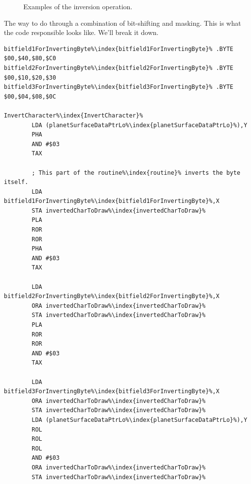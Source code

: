\begin{figure}[H]
{\begin{adjustbox}{width=10cm,center}
    \end{adjustbox}
  }\caption{Examples of the inversion operation.}
\end{figure}

The way to do through a combination of bit-shifting and masking. This is what the code
responsible looks like. We'll break it down.

\begin{lstlisting}[caption=\icode{InvertSurfaceDataForLowerPlanet\index{InvertSurfaceDataForLowerPlanet}}.,escapechar=\%]
bitfield1ForInvertingByte%\index{bitfield1ForInvertingByte}% .BYTE $00,$40,$80,$C0
bitfield2ForInvertingByte%\index{bitfield2ForInvertingByte}% .BYTE $00,$10,$20,$30
bitfield3ForInvertingByte%\index{bitfield3ForInvertingByte}% .BYTE $00,$04,$08,$0C

InvertCharacter%\index{InvertCharacter}%
        LDA (planetSurfaceDataPtrLo%\index{planetSurfaceDataPtrLo}%),Y
        PHA
        AND #$03
        TAX

        ; This part of the routine%\index{routine}% inverts the byte itself.
        LDA bitfield1ForInvertingByte%\index{bitfield1ForInvertingByte}%,X
        STA invertedCharToDraw%\index{invertedCharToDraw}%
        PLA
        ROR
        ROR
        PHA
        AND #$03
        TAX

        LDA bitfield2ForInvertingByte%\index{bitfield2ForInvertingByte}%,X
        ORA invertedCharToDraw%\index{invertedCharToDraw}%
        STA invertedCharToDraw%\index{invertedCharToDraw}%
        PLA
        ROR
        ROR
        AND #$03
        TAX

        LDA bitfield3ForInvertingByte%\index{bitfield3ForInvertingByte}%,X
        ORA invertedCharToDraw%\index{invertedCharToDraw}%
        STA invertedCharToDraw%\index{invertedCharToDraw}%
        LDA (planetSurfaceDataPtrLo%\index{planetSurfaceDataPtrLo}%),Y
        ROL
        ROL
        ROL
        AND #$03
        ORA invertedCharToDraw%\index{invertedCharToDraw}%
        STA invertedCharToDraw%\index{invertedCharToDraw}%
\end{lstlisting}

